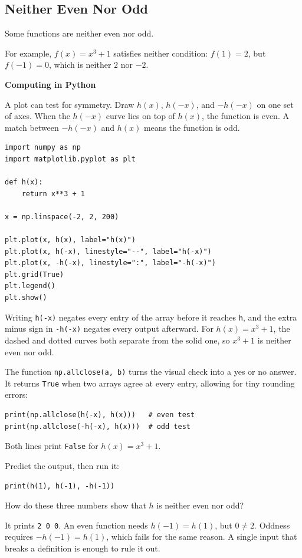 \subsection{Neither Even Nor Odd}
Some functions are neither even nor odd.

For example, \( f(x) = x^3 + 1 \) satisfies neither condition: $f(1) = 2$,
but $f(-1) = 0$, which is neither $2$ nor $-2$.


\textbf{Computing in Python}

A plot can test for symmetry. Draw $h(x)$, $h(-x)$, and $-h(-x)$ on one set
of axes. When the $h(-x)$ curve lies on top of $h(x)$, the function is even.
A match between $-h(-x)$ and $h(x)$ means the function is odd.

\begin{verbatim}
import numpy as np
import matplotlib.pyplot as plt

def h(x):
    return x**3 + 1

x = np.linspace(-2, 2, 200)

plt.plot(x, h(x), label="h(x)")
plt.plot(x, h(-x), linestyle="--", label="h(-x)")
plt.plot(x, -h(-x), linestyle=":", label="-h(-x)")
plt.grid(True)
plt.legend()
plt.show()
\end{verbatim}

Writing \texttt{h(-x)} negates every entry of the array before
it reaches \texttt{h}, and the extra minus sign in
\texttt{-h(-x)} negates every output afterward. For
$h(x) = x^3 + 1$, the dashed and dotted curves both separate from the solid
one, so $x^3 + 1$ is neither even nor odd.

The function \texttt{np.allclose(a, b)} turns the visual check
into a yes or no answer. It returns \texttt{True} when two arrays
agree at every entry, allowing for tiny rounding errors:

\begin{verbatim}
print(np.allclose(h(-x), h(x)))   # even test
print(np.allclose(-h(-x), h(x)))  # odd test
\end{verbatim}

Both lines print \texttt{False} for $h(x) = x^3 + 1$.

\begin{Exercise}[title={One input is enough}, label={ex:functions-python-4}]
  Predict the output, then run it:
  \begin{verbatim}
print(h(1), h(-1), -h(-1))
  \end{verbatim}
  How do these three numbers show that $h$ is neither even nor odd?
\end{Exercise}
\begin{Answer}[ref={ex:functions-python-4}]
  It prints \texttt{2 0 0}. An even function needs
  $h(-1) = h(1)$, but $0 \neq 2$. Oddness requires $-h(-1) = h(1)$, which
  fails for the same reason. A single input that breaks a definition is enough
  to rule it out.
\end{Answer}

